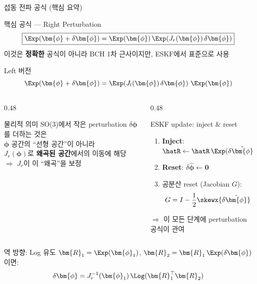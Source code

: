\begin{frame}[shrink=5]{섭동 전파 공식 (핵심 요약)}
  \begin{alertblock}{\large 핵심 공식 --- Right Perturbation}
    \[
      \boxed{
        \Exp(\bm{\phi} + \delta\bm{\phi})
        = \Exp(\bm{\phi})\,\Exp\!\left(J_r(\bm{\phi})\,\delta\bm{\phi}\right)
      }
    \]
    이것은 \textbf{정확한} 공식이 아니라 BCH 1차 근사이지만, ESKF에서 표준으로 사용
  \end{alertblock}
  \pause
  \begin{block}{Left 버전}
    \[
      \Exp(\bm{\phi} + \delta\bm{\phi})
      = \Exp\!\left(J_l(\bm{\phi})\,\delta\bm{\phi}\right)\,\Exp(\bm{\phi})
    \]
  \end{block}
  \pause
  \begin{columns}[T]
    \begin{column}{0.48\textwidth}
      \begin{block}{물리적 의미}
        SO(3)에서 작은 perturbation $\delta\bm{\phi}$를 더하는 것은\\
        $\bm{\phi}$ 공간의 ``선형 공간''이 아니라\\
        $J_r(\bm{\phi})$로 \textbf{왜곡된 공간}에서의 이동에 해당
        \medskip\\
        $\Rightarrow$ $J_r$이 이 ``왜곡''을 보정
      \end{block}
    \end{column}
    \begin{column}{0.48\textwidth}
      \begin{exampleblock}{ESKF update: inject \& reset}
        \begin{enumerate}
          \item \textbf{Inject}: $\hatR \leftarrow \hatR\,\Exp(\delta\hat{\bm{\phi}})$
          \item \textbf{Reset}: $\delta\hat{\bm{\phi}} \leftarrow \bm{0}$
          \item 공분산 reset (Jacobian $G$):
                \[G = I - \frac{1}{2}\skewx{\delta\hat{\bm{\phi}}}\]
        \end{enumerate}
        $\Rightarrow$ 이 모든 단계에 perturbation 공식이 관여
      \end{exampleblock}
    \end{column}
  \end{columns}
  \pause
  \vspace{0.3em}
  \begin{exampleblock}{역 방향: Log 유도}
    $\bm{R}_1 = \Exp(\bm{\phi}_1)$, $\bm{R}_2 = \bm{R}_1\,\Exp(\delta\bm{\phi})$이면:
    \[
      \delta\bm{\phi} = J_r^{-1}(\bm{\phi}_1)\,\Log(\bm{R}_1^\top\bm{R}_2)
    \]
  \end{exampleblock}
\end{frame}


